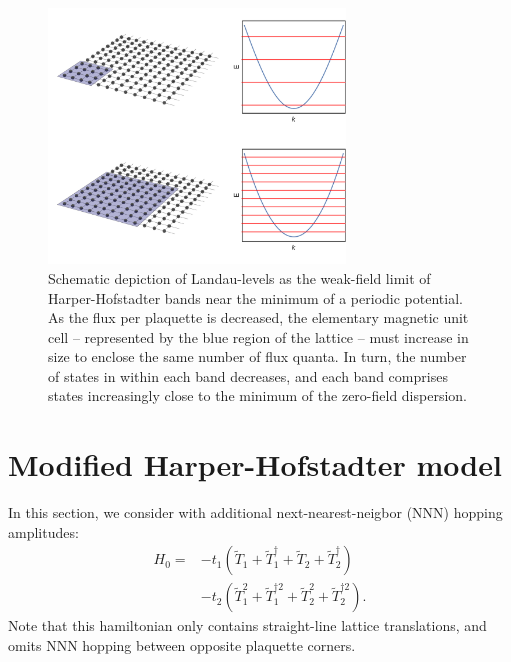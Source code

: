 \documentclass[aps,prb,twocolumn,letterpaper,twoside,nobalancelastpage,groupedaddress,amsmath,amssymb,floatfix,citeautoscript]{revtex4-1}
\begin{document}
\begin{figure}[thb]
\centering
\includegraphics[width=3.1in]{test.pdf}
\caption{\label{bands-schematic}Schematic depiction of Landau-levels as the weak-field limit of Harper-Hofstadter bands near the minimum of a periodic potential. As the flux per plaquette is decreased, the elementary magnetic unit cell -- represented by the blue region of the lattice -- must increase in size to enclose the same number of flux quanta. In turn, the number of states in within each band decreases, and each band comprises states increasingly close to the minimum of the zero-field dispersion.}
\end{figure}

\section{Modified Harper-Hofstadter model}
In this section, we consider with additional next-nearest-neigbor (NNN) hopping amplitudes:
\begin{align}
\label{quartic-harper}
H_0 = &-t_1 \left(\widetilde{T}_1 + \widetilde{T}_1^{\dag} + \widetilde{T}_2 + \widetilde{T}_2^{\dag}\right)\nonumber\\ &- t_2 \left(\widetilde{T}_1^{2} + \widetilde{T}_1^{\dag 2} + \widetilde{T}_2^{2} + \widetilde{T}_2^{\dag 2}\right).
\end{align}
Note that this hamiltonian only contains straight-line lattice translations, and omits NNN hopping between opposite plaquette corners. 


\end{document}
